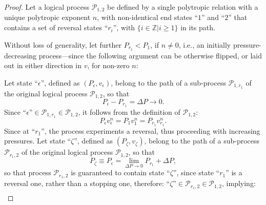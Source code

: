 \documentclass[fleqn,11pt]{SelfArx}
\begin{document}
    \begin{proof}
        Let a logical process $\mathcal{P}_{1,2}$ be defined by  a  single  polytropic  relation
        with a unique polytropic exponent $n$, with non-identical end states ``$1$'' and ``$2$''
        that contains a set of reversal  states  ``$r_i$'',  with  $\{  i  \in  \mathbb{Z}  |  i
        \geqslant 1 \}$ in its path.

        Without loss of generality, let further $P_{r_1}  <  P_1$,  if  $n  \neq  0$,  i.e.,  an
        initially pressure-decreasing process---since the following argument  can  be  otherwise
        flipped, or laid out in either direction in $v$, for non-zero $n$:

        Let state ``$\epsilon$'', defined as $(P_{\epsilon}, v_{\epsilon})$, belong to the  path
        of   a   sub-process   $\mathcal{P}_{1,r_1}$   of   the   original    logical    process
        $\mathcal{P}_{1,2}$, so that
        \begin{equation}
            P_{\epsilon} - P_{r_1} = \Delta P \to 0.
            \label{eq:proof.Delta.P.epsi}
        \end{equation}
        Since $\mbox{``}\epsilon\mbox{''} \in  \mathcal{P}_{1,r_1}  \in  \mathcal{P}_{1,2}$,  it
        follows from the definition of $\mathcal{P}_{1,2}$:
        \begin{equation}
            P_{\epsilon}v_{\epsilon}^n = P_1v_1^n = P_{r_1}v_{r_1}^n.
            \label{eq:proof.Process.epsi}
        \end{equation}
        Since at ``$r_1$'', the process experiments a reversal, thus proceeding with  increasing
        pressures. Let state ``$\zeta$'', defined as $(P_{\zeta},  v_{\zeta})$,  belong  to  the
        path  of  a  sub-process  $\mathcal{P}_{r_1,2}$  of   the   original   logical   process
        $\mathcal{P}_{1,2}$, so that
        \begin{equation}
            P_{\zeta} \equiv P_{\epsilon} = \lim_{\Delta P \to 0} P_{r_1} + \Delta P,
            \label{eq:proof.P.zeta}
        \end{equation}
        \noindent  so  that  process  $\mathcal{P}_{r_1,2}$  is  guaranteed  to  contain   state
        ``$\zeta$'', since state ``$r_1$'' is a  reversal  one,  rather  than  a  stopping  one,
        therefore:  $\mbox{``}\zeta\mbox{''}  \in  \mathcal{P}_{r_1,2}  \in  \mathcal{P}_{1,2}$,
        implying:
        \begin{align}

\end{align}
\end{proof}
\end{document}
